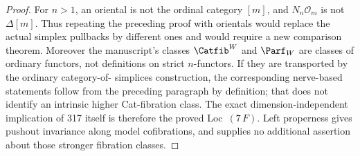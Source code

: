 \begin{proof}
For $n>1$, an oriental is not the ordinal category $[m]$, and
$N_n\mathcal O_m$ is not $\Delta[m]$. Thus repeating the preceding
proof with orientals would replace the actual simplex pullbacks
by different ones and would require a new comparison theorem.
Moreover the manuscript's classes $\Catfib^W$ and $\Parf_W$
are classes of ordinary functors, not definitions on strict
$n$-functors. If they are transported by the ordinary category-of-
simplices construction, the corresponding nerve-based statements
follow from the preceding paragraph by definition; that does not
identify an intrinsic higher Cat-fibration class. The exact
dimension-independent implication of 317 itself is therefore the
proved Loc~$(7\,F)$. Left properness gives pushout invariance
along model cofibrations, and supplies no additional assertion
about those stronger fibration classes.
\end{proof}
